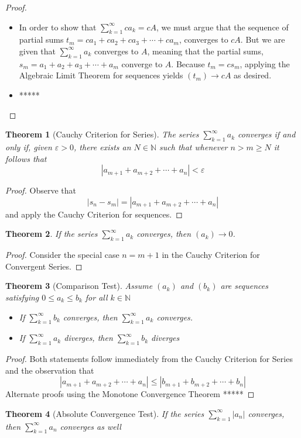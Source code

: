 \documentclass[10pt]{report}
\newtheorem{thm2}{Theorem}[section]
\newcommand{\eps}{\varepsilon}
\begin{document}
\begin{proof}
\begin{itemize}
\item[(i)] In order to show that $\sum_{k=1}^\infty ca_k = cA$, we must argue that the sequence of partial sums $t_m = ca_1 + ca_2 + ca_3 + \cdots + ca_m$, converges to $cA$. But we are given that $\sum_{k=1}^\infty a_k$ converges to $A$, meaning that the partial sums, $s_m = a_1 + a_2 + a_3 + \cdots + a_m$
converge to $A$. Because $t_m = cs_m$, applying the Algebraic Limit Theorem for sequences yields $(t_m)\to cA$ as desired.
\item[(ii)] *****
\end{itemize}
\end{proof}
\begin{thm2}[Cauchy Criterion for Series]
The series $\sum_{k=1}^\infty a_k$ converges if and only if, given $\eps>0$, there exists an $N\in\mathbb{N}$ such that whenever $n>m\geq N$ it follows that
$$|a_{m+1} + a_{m+2} + \cdots + a_n|<\eps$$
\end{thm2}
\begin{proof}
Observe that
$$|s_n-s_m|=|a_{m+1}+a_{m+2}+\cdots +a_n|$$
and apply the Cauchy Criterion for sequences.
\end{proof}
\begin{thm2}
If the series $\sum_{k=1}^\infty a_k$ converges, then $(a_k)\to 0$.
\end{thm2}
\begin{proof}
Consider the special case $n=m+1$ in the Cauchy Criterion for Convergent Series.
\end{proof}
\begin{thm2}[Comparison Test]
Assume $(a_k)$ and $(b_k)$ are sequences satisfying $0\leq a_k \leq b_k$ for all $k\in\mathbb{N}$
\begin{itemize}
\item[(i)] If $\sum_{k=1}^\infty b_k$ converges, then $\sum_{k=1}^\infty a_k$ converges.
\item[(ii)] If $\sum_{k=1}^\infty a_k$ diverges, then $\sum_{k=1}^\infty b_k$ diverges
\end{itemize}
\end{thm2}
\begin{proof}
Both statements follow immediately from the Cauchy Criterion for Series and the observation that 
$$|a_{m+1} + a_{m+2} + \cdots + a_n|\leq |b_{m+1} + b_{m+2} + \cdots + b_n|$$
Alternate proofs using the Monotone Convergence Theorem *****
\end{proof}
\begin{thm2}[Absolute Convergence Test]
If the series $\sum_{k=1}^\infty |a_n|$ converges, then $\sum_{k=1}^\infty a_n$ converges as well
\end{thm2}
\end{document}
